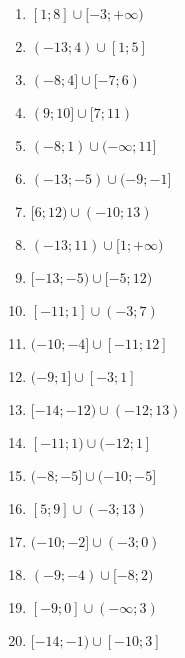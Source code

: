 \documentclass[12pt,a4paper]{article}
\begin{document}
\begin{ex}
\begin{enumerate}
		\item $[1;8]\cup[-3;+ \infty)$
		\item $(-13;4)\cup[1;5]$
		\item $(-8;4]\cup[-7;6)$
		\item $(9;10]\cup[7;11)$
		\item $(-8;1)\cup(-\infty;11]$
		\item $(-13;-5)\cup(-9;-1]$
		\item $[6;12)\cup(-10;13)$
		\item $(-13;11)\cup[1;+ \infty)$
		\item $[-13;-5)\cup[-5;12)$
		\item $[-11;1]\cup(-3;7)$
		\item $(-10;-4]\cup[-11;12]$
		\item $(-9;1]\cup[-3;1]$
		\item $[-14;-12)\cup(-12;13)$
		\item $[-11;1)\cup(-12;1]$
		\item $(-8;-5]\cup(-10;-5]$
		\item $[5;9]\cup(-3;13)$
		\item $(-10;-2]\cup(-3;0)$
		\item $(-9;-4)\cup[-8;2)$
		\item $[-9;0]\cup(-\infty;3)$
		\item $[-14;-1)\cup[-10;3]$
	\end{enumerate}
\end{ex}
\end{document}
